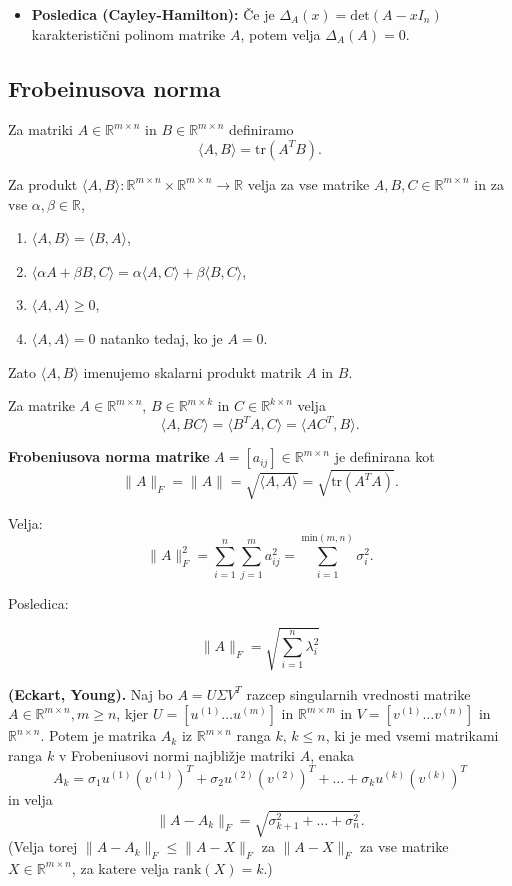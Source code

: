 \documentclass{article}
\begin{document}
\begin{multicols}{2}
\begin{itemize}
    \item \textbf{Posledica (Cayley-Hamilton):} Če je \( \Delta_A(x) = \text{det}(A - xI_n) \) karakteristični polinom matrike \( A \), potem velja \( \Delta_A(A) = 0 \).
\end{itemize}

\subsection{Frobeinusova norma}

Za matriki \( A \in \mathbb{R}^{m \times n} \) in \( B \in \mathbb{R}^{m \times n} \) definiramo
\[
\langle A, B \rangle = \text{tr}(A^T B).
\]

Za produkt \( \langle A, B \rangle: \mathbb{R}^{m \times n} \times \mathbb{R}^{m \times n} \rightarrow \mathbb{R} \) velja za vse matrike \( A, B, C \in \mathbb{R}^{m \times n} \) in za vse \( \alpha, \beta \in \mathbb{R} \),
\begin{enumerate}
    \item \( \langle A, B \rangle = \langle B, A \rangle \),
    \item \( \langle \alpha A + \beta B, C \rangle = \alpha \langle A, C \rangle + \beta \langle B, C \rangle \),
    \item \( \langle A, A \rangle \geq 0 \),
    \item \( \langle A, A \rangle = 0 \) natanko tedaj, ko je \( A = 0 \).
\end{enumerate}
Zato \( \langle A, B \rangle \) imenujemo skalarni produkt matrik \( A \) in \( B \).

Za matrike \( A \in \mathbb{R}^{m \times n} \), \( B \in \mathbb{R}^{m \times k} \) in \( C \in \mathbb{R}^{k \times n} \) velja
\[
\langle A, BC \rangle = \langle B^T A, C \rangle = \langle A C^T, B \rangle.
\]


\textbf{Frobeniusova norma matrike} \( A = [a_{ij}] \in \mathbb{R}^{m \times n} \) je definirana kot
\[
\|A\|_F = \|A\| = \sqrt{\langle A, A \rangle} = \sqrt{\text{tr}(A^T A)}.
\]

Velja:
\[
\|A\|_F^2 = \sum_{i=1}^{n} \sum_{j=1}^{m} a_{ij}^2 = \sum_{i=1}^{\text{min}(m,n)} \sigma_i^2.
\]

Posledica:

\[
\|A\|_F = \sqrt{\sum_{i=1}^{n} \lambda_i^2}
\]

\textbf{(Eckart, Young).} Naj bo \( A = U\Sigma V^T \) razcep singularnih vrednosti matrike \( A \in \mathbb{R}^{m \times n}, m \geq n \), kjer \( U = [u^{(1)} \ldots u^{(m)}] \) in \( \mathbb{R}^{m \times m} \) in \( V = [v^{(1)} \ldots v^{(n)}] \) in \( \mathbb{R}^{n \times n} \). Potem je matrika \( A_k \) iz \( \mathbb{R}^{m \times n} \) ranga \( k \), \( k \leq n \), ki je med vsemi matrikami ranga \( k \) v Frobeniusovi normi najbližje matriki \( A \), enaka
\[
A_k = \sigma_1 u^{(1)}(v^{(1)})^T + \sigma_2 u^{(2)}(v^{(2)})^T + \ldots + \sigma_k u^{(k)}(v^{(k)})^T
\]
in velja
\[
\| A - A_k \|_F = \sqrt{\sigma_{k+1}^2 + \ldots + \sigma_n^2}.
\]
(Velja torej \( \|A - A_k\|_F \leq \|A - X\|_F \) za \( \|A - X\|_F \) za vse matrike \( X \in \mathbb{R}^{m \times n} \), za katere velja \( \text{rank}(X) = k \).)


\end{multicols}
\end{document}

